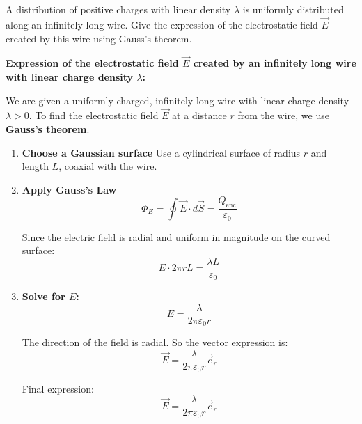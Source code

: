 \documentclass[12pt]{article}
\begin{document}
\newpage

\section{}
A distribution of positive charges with linear density $\lambda$ is uniformly distributed along an infinitely long wire. Give the expression of the electrostatic field $\vec{E}$ created by this wire using Gauss's theorem.

\newpage

\begin{answerbox}
    \textbf{Expression of the electrostatic field $ \vec{E} $ created by an infinitely long wire with linear charge density $ \lambda $:}
    
    We are given a uniformly charged, infinitely long wire with linear charge density $ \lambda > 0 $. To find the electrostatic field $ \vec{E} $ at a distance $ r $ from the wire, we use \textbf{Gauss's theorem}.
   
    \begin{enumerate}
    \item \textbf{Choose a Gaussian surface}  
    Use a cylindrical surface of radius $ r $ and length $ L $, coaxial with the wire.
    
    \item \textbf{Apply Gauss’s Law}
    $$
    \Phi_E = \oint \vec{E} \cdot d\vec{S} = \frac{Q_{\text{enc}}}{\varepsilon_0}
    $$
    
    Since the electric field is radial and uniform in magnitude on the curved surface:
    $$
    E \cdot 2\pi r L = \frac{\lambda L}{\varepsilon_0}
    $$
    
    \item\textbf{Solve for $ E $:}
    $$
    E = \frac{\lambda}{2\pi\varepsilon_0 r}
    $$
    
    The direction of the field is radial. So the vector expression is:
    $$
    \vec{E} = \frac{\lambda}{2\pi\varepsilon_0 r} \vec{e}_r
    $$
    
    Final expression:
    $$
    \boxed{\vec{E} = \frac{\lambda}{2\pi\varepsilon_0 r} \vec{e}_r}
    $$
    \end{enumerate}
\end{answerbox}

\newpage

\end{document}
